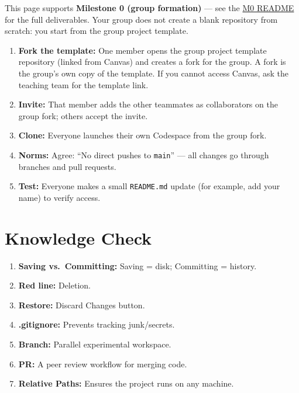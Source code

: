 \documentclass[
  letterpaper,
  DIV=11,
  numbers=noendperiod,
  oneside]{scrreprt}
\providecommand{\tightlist}{%
  \setlength{\itemsep}{0pt}\setlength{\parskip}{0pt}}
\begin{document}
This page supports \textbf{Milestone 0 (group formation)} --- see the
\href{../../milestones/m0-group-formation/README.md}{M0 README} for the
full deliverables. Your group does not create a blank repository from
scratch: you start from the group project template.

\begin{enumerate}
\def\labelenumi{\arabic{enumi}.}
\tightlist
\item
  \textbf{Fork the template:} One member opens the group project
  template repository (linked from Canvas) and creates a fork for the
  group. A fork is the group's own copy of the template. If you cannot
  access Canvas, ask the teaching team for the template link.
\item
  \textbf{Invite:} That member adds the other teammates as collaborators
  on the group fork; others accept the invite.
\item
  \textbf{Clone:} Everyone launches their own Codespace from the group
  fork.
\item
  \textbf{Norms:} Agree: ``No direct pushes to \texttt{main}'' --- all
  changes go through branches and pull requests.
\item
  \textbf{Test:} Everyone makes a small \texttt{README.md} update (for
  example, add your name) to verify access.
\end{enumerate}

\chapter*{Knowledge Check}\label{knowledge-check-1}


\begin{enumerate}
\def\labelenumi{\arabic{enumi}.}
\tightlist
\item
  \textbf{Saving vs.~Committing:} Saving = disk; Committing = history.
\item
  \textbf{Red line:} Deletion.
\item
  \textbf{Restore:} Discard Changes button.
\item
  \textbf{.gitignore:} Prevents tracking junk/secrets.
\item
  \textbf{Branch:} Parallel experimental workspace.
\item
  \textbf{PR:} A peer review workflow for merging code.
\item
  \textbf{Relative Paths:} Ensures the project runs on any machine.
\end{enumerate}
\end{document}
